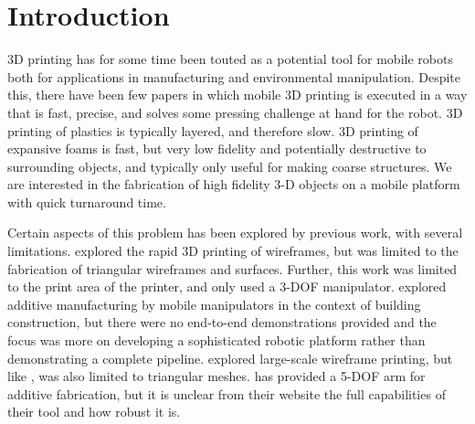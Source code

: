 \documentclass[conference]{acmsiggraph}
\begin{document}

\keywordlist


\TOGlinkslist


\copyrightspace

\section{Introduction}




3D printing has for some time been touted as a potential tool for mobile robots both for applications in manufacturing and environmental manipulation.  Despite this, there have been few papers in which mobile 3D printing is executed in a way that is fast, precise, and solves some pressing challenge at hand for the robot.  3D printing of plastics is typically layered, and therefore slow.  3D printing of expansive foams  is fast, but very low fidelity and potentially destructive to surrounding objects, and typically only useful for making coarse structures.  We are interested in the fabrication of high fidelity 3-D objects on a mobile platform with quick turnaround time.

Certain aspects of this problem has been explored by previous work, with several limitations.  \cite{WirePrint} explored the rapid 3D printing of wireframes, but was limited to the fabrication of triangular wireframes and surfaces.  Further, this work was limited to the print area of the printer, and only used a 3-DOF manipulator.  \cite{ArmFab} explored additive manufacturing by mobile manipulators in the context of building construction, but there were no end-to-end demonstrations provided and the focus was more on developing a sophisticated robotic platform rather than demonstrating a complete pipeline.  \cite{ArchFab} explored large-scale wireframe printing, but like \cite{WirePrint}, was also limited to triangular meshes.  \cite{Mataerial} has provided a 5-DOF arm for additive fabrication, but it is unclear from their website the full capabilities of their tool and how robust it is.
\end{document}
